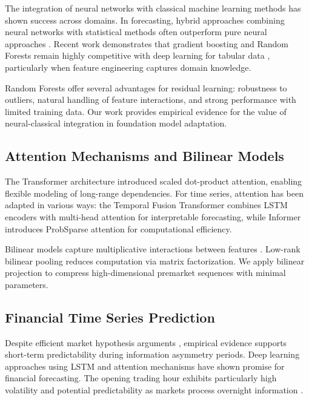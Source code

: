 \documentclass[10pt,conference]{IEEEtran}
\begin{document}
The integration of neural networks with classical machine learning methods has shown success across domains. In forecasting, hybrid approaches combining neural networks with statistical methods often outperform pure neural approaches \cite{makridakis2018statistical}. Recent work demonstrates that gradient boosting and Random Forests remain highly competitive with deep learning for tabular data \cite{grinsztajn2022tree}, particularly when feature engineering captures domain knowledge.

Random Forests \cite{breiman2001random} offer several advantages for residual learning: robustness to outliers, natural handling of feature interactions, and strong performance with limited training data. Our work provides empirical evidence for the value of neural-classical integration in foundation model adaptation.

\subsection{Attention Mechanisms and Bilinear Models}

The Transformer architecture \cite{vaswani2017attention} introduced scaled dot-product attention, enabling flexible modeling of long-range dependencies. For time series, attention has been adapted in various ways: the Temporal Fusion Transformer \cite{lim2021temporal} combines LSTM encoders with multi-head attention for interpretable forecasting, while Informer \cite{zhou2021informer} introduces ProbSparse attention for computational efficiency.

Bilinear models capture multiplicative interactions between features \cite{tenenbaum2000separating}. Low-rank bilinear pooling \cite{kim2017hadamard} reduces computation via matrix factorization. We apply bilinear projection to compress high-dimensional premarket sequences with minimal parameters.

\subsection{Financial Time Series Prediction}

Despite efficient market hypothesis arguments \cite{fama1970efficient}, empirical evidence supports short-term predictability during information asymmetry periods. Deep learning approaches using LSTM \cite{fischer2018deep} and attention mechanisms have shown promise for financial forecasting. The opening trading hour exhibits particularly high volatility and potential predictability as markets process overnight information \cite{hasbrouck2013low}.
\end{document}
